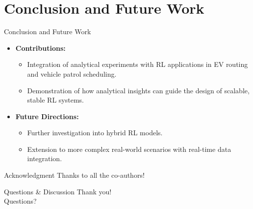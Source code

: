 \documentclass{beamer}
\begin{document}
\section{Conclusion and Future Work}
\begin{frame}{Conclusion and Future Work}
  \begin{itemize}[<+->]
    \item \textbf{Contributions:}
      \begin{itemize}[<+->]
        \item Integration of analytical experiments with RL applications in EV routing and vehicle patrol scheduling.
        \item Demonstration of how analytical insights can guide the design of scalable, stable RL systems.
      \end{itemize}
    \item \textbf{Future Directions:}
      \begin{itemize}[<+->]
        \item Further investigation into hybrid RL models.
        \item Extension to more complex real-world scenarios with real-time data integration.
      \end{itemize}
  \end{itemize}
\end{frame}

\begin{frame}{Acknowledgment}
\centering
Thanks to all the co-authors!
\end{frame}

\begin{frame}{Questions \& Discussion}
  \centering
  \Large{Thank you! \\[1em] Questions?}
\end{frame}
\end{document}
